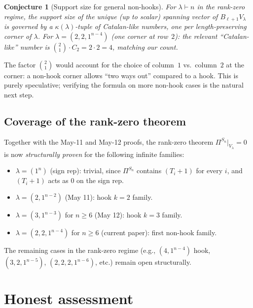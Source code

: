 \documentclass[11pt]{article}
\newtheorem{conjecture}[theorem]{Conjecture}
\theoremstyle{definition}
\begin{document}
\begin{conjecture}[Support size for general non-hooks]\label{conj:nonhook}
For $\lambda \vdash n$ in the rank-zero regime, the support size of
the unique (up to scalar) spanning vector of $B_{\ell+1}V_\lambda$ is
governed by a $\kappa(\lambda)$-tuple of Catalan-like numbers, one per
length-preserving corner of $\lambda$.  For $\lambda = (2,2,1^{n-4})$
(one corner at row~$2$): the relevant ``Catalan-like'' number is
$\binom{2}{1} \cdot C_2 = 2 \cdot 2 = 4$, matching our count.
\end{conjecture}

The factor $\binom{2}{1}$ would account for the choice of column~$1$
vs.\ column~$2$ at the corner: a non-hook corner allows ``two ways
out'' compared to a hook.  This is purely speculative; verifying the
formula on more non-hook cases is the natural next step.

\subsection{Coverage of the rank-zero theorem}

Together with the May-11 and May-12 proofs, the rank-zero theorem
$\Pi^{S_n}|_{V_\lambda} = 0$ is now \emph{structurally proven} for
the following infinite families:
\begin{itemize}[leftmargin=2em,topsep=0.3em,itemsep=0.2em]
\item $\lambda = (1^n)$ (sign rep): trivial, since $\Pi^{S_n}$
contains $(T_i{+}1)$ for every $i$, and $(T_i{+}1)$ acts as $0$ on
the sign rep.
\item $\lambda = (2, 1^{n-2})$ (May 11): hook $k=2$ family.
\item $\lambda = (3, 1^{n-3})$ for $n \ge 6$ (May 12): hook $k=3$
family.
\item $\lambda = (2, 2, 1^{n-4})$ for $n \ge 6$ (current paper):
first non-hook family.
\end{itemize}
The remaining cases in the rank-zero regime (e.g., $(4, 1^{n-4})$
hook, $(3, 2, 1^{n-5})$, $(2, 2, 2, 1^{n-6})$, etc.) remain open
structurally.

\section{Honest assessment}\label{sec:honest}
\end{document}

